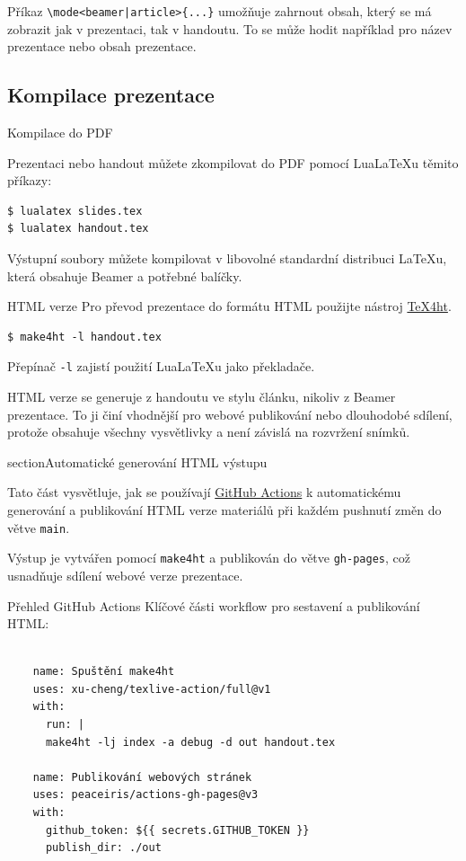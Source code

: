 Příkaz \verb+\mode<beamer|article>{...}+ umožňuje zahrnout obsah, který se má
zobrazit jak v prezentaci, tak v handoutu. To se může hodit například pro název
prezentace nebo obsah prezentace.

\subsection{Kompilace prezentace}

\begin{frame}[fragile]{Kompilace do PDF}

Prezentaci nebo handout můžete zkompilovat do PDF pomocí LuaLaTeXu těmito příkazy:

\begin{verbatim}
$ lualatex slides.tex
$ lualatex handout.tex
\end{verbatim}
\end{frame}



Výstupní soubory můžete kompilovat v libovolné standardní distribuci \LaTeX{}u, která obsahuje Beamer a potřebné balíčky.

\begin{frame}[fragile]{HTML verze}
Pro převod prezentace do formátu HTML použijte nástroj \href{https://www.tug.org/tex4ht/}{\TeX4ht}.
\begin{verbatim}
$ make4ht -l handout.tex\end{verbatim}

Přepínač \verb|-l| zajistí použití Lua\LaTeX{}u jako překladače.
\end{frame}

HTML verze se generuje z handoutu ve stylu článku, nikoliv z Beamer prezentace.
To ji činí vhodnější pro webové publikování nebo dlouhodobé sdílení, protože
obsahuje všechny vysvětlivky a není závislá na rozvržení snímků.

section{Automatické generování HTML výstupu}

Tato část vysvětluje, jak se používají \href{https://docs.github.com/en/actions/writing-workflows/quickstart}{GitHub Actions} k automatickému generování a publikování HTML verze materiálů při každém pushnutí změn do větve \texttt{main}.

Výstup je vytvářen pomocí \texttt{make4ht} a publikován do větve \texttt{gh-pages}, což usnadňuje sdílení webové verze prezentace.

\begin{frame}[fragile]{Přehled GitHub Actions}
Klíčové části workflow pro sestavení a publikování HTML:

\begin{verbatim}

    name: Spuštění make4ht
    uses: xu-cheng/texlive-action/full@v1
    with:
      run: |
      make4ht -lj index -a debug -d out handout.tex

    name: Publikování webových stránek
    uses: peaceiris/actions-gh-pages@v3
    with:
      github_token: ${{ secrets.GITHUB_TOKEN }}
      publish_dir: ./out
\end{verbatim}

\end{frame}

